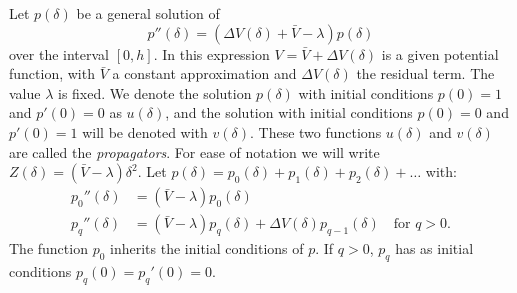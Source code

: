 \begin{theorem}[Ixaru 1984]\label{the:c2_perturbation_terms}
    Let $p(\delta)$ be a general solution of
    $$
        p''(\delta) = \left(\Delta V(\delta) + \bar{V} - \lambda\right)p(\delta)
    $$
    over the interval $[0, h]$. In this expression $V = \bar{V} + \Delta V(\delta)$ is a given potential function, with $\bar{V}$ a constant approximation and $\Delta V(\delta)$ the residual term. The value $\lambda$ is fixed. We denote the solution $p(\delta)$ with initial conditions $p(0) = 1$ and $p'(0)=0$ as $u(\delta)$, and the solution with initial conditions $p(0) = 0$ and $p'(0) = 1$ will be denoted with $v(\delta)$. These two functions $u(\delta)$ and $v(\delta)$ are called the \emph{propagators}. For ease of notation we will write $Z(\delta) = \left(\bar{V} - \lambda\right)\delta^2$. Let $p(\delta) = p_0(\delta) + p_1(\delta) + p_2(\delta) + \dots$ with:
    \begin{align*}
        p_0''(\delta) & = (\bar{V} - \lambda) p_0(\delta)                                                             \\
        p_q''(\delta) & = (\bar{V} - \lambda) p_q(\delta) + \Delta V(\delta) p_{q-1}(\delta) \quad\text{for $q > 0$.}
    \end{align*}
    The function $p_0$ inherits the initial conditions of $p$. If $q > 0$, $p_q$ has as initial conditions $p_q(0) = p_q'(0) = 0$.



\end{theorem}

